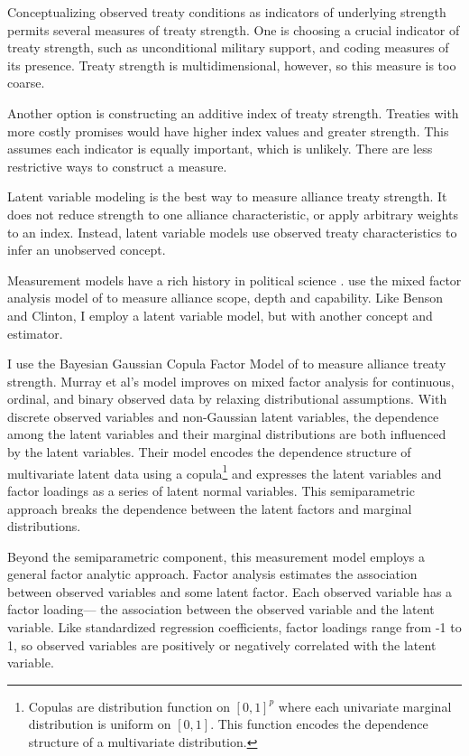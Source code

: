 \documentclass[12pt]{article}
\begin{document}
Conceptualizing observed treaty conditions as indicators of underlying strength permits several measures of treaty strength. 
One is choosing a crucial indicator of treaty strength, such as unconditional military support, and coding measures of its presence. 
Treaty strength is multidimensional, however, so this measure is too coarse. 


Another option is constructing an additive index of treaty strength. 
Treaties with more costly promises would have higher index values and greater strength. 
This assumes each indicator is equally important, which is unlikely. 
There are less restrictive ways to construct a measure. 


Latent variable modeling is the best way to measure alliance treaty strength. 
It does not reduce strength to one alliance characteristic, or apply arbitrary weights to an index. 
Instead, latent variable models use observed treaty characteristics to infer an unobserved concept. 


Measurement models have a rich history in political science \citep{Clintonetal2004, TreierJackman2008, Fariss2014}. 
\citet{BensonClinton2016} use the mixed factor analysis model of \citet{Quinn2004} to measure alliance scope, depth and capability.
Like Benson and Clinton, I employ a latent variable model, but with another concept and estimator. 


I use the Bayesian Gaussian Copula Factor Model of \citet{Murrayetal2013} to measure alliance treaty strength. 
Murray et al's model improves on mixed factor analysis for continuous, ordinal, and binary observed data by relaxing distributional assumptions. 
With discrete observed variables and non-Gaussian latent variables, the dependence among the latent variables and their marginal distributions are both influenced by the latent variables.
Their model encodes the dependence structure of multivariate latent data using a copula\footnote{
Copulas are distribution function on $[0, 1]^p$ where each univariate marginal distribution is uniform on $[0,1]$. This function encodes the dependence structure of a multivariate distribution.
} 
and expresses the latent variables and factor loadings as a series of latent normal variables. 
This semiparametric approach breaks the dependence between the latent factors and marginal distributions. 


Beyond the semiparametric component, this measurement model employs a general factor analytic approach.
Factor analysis estimates the association between observed variables and some latent factor.
Each observed variable has a factor loading--- the association between the observed variable and the latent variable.  
Like standardized regression coefficients, factor loadings range from -1 to 1, so observed variables are positively or negatively correlated with the latent variable.  
\end{document}
